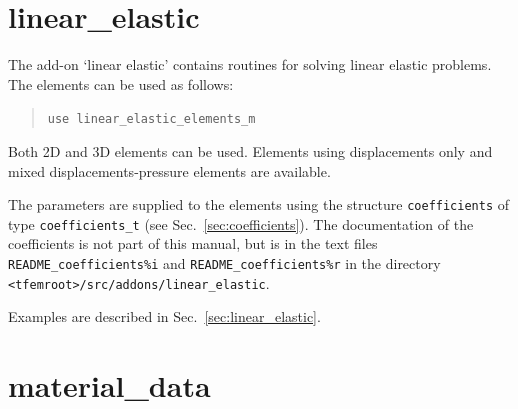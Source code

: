 \section{linear\_elastic}
\label{sec:linearelasticaddon}

The add-on `linear elastic' contains routines for solving linear elastic problems.
The elements can be used as follows:
\begin{quote}
   \texttt{use linear\_elastic\_elements\_m}
\end{quote}
Both 2D and 3D elements can be used. Elements using displacements only and mixed displacements-pressure elements are available.

The parameters are
supplied to the elements using the structure \texttt{coefficients} of type
\texttt{coefficients\_t} (see Sec.~\ref{sec:coefficients}). The documentation
of the coefficients is not part of this manual, but is in the text files
\texttt{README\_coefficients\%i} and
\texttt{README\_coefficients\%r} in the directory
\texttt{<tfemroot>/src/addons/linear\_elastic}.

Examples are described in Sec.~\ref{sec:linear_elastic}.

\section{material\_data}
\label{sec:materialdata}

